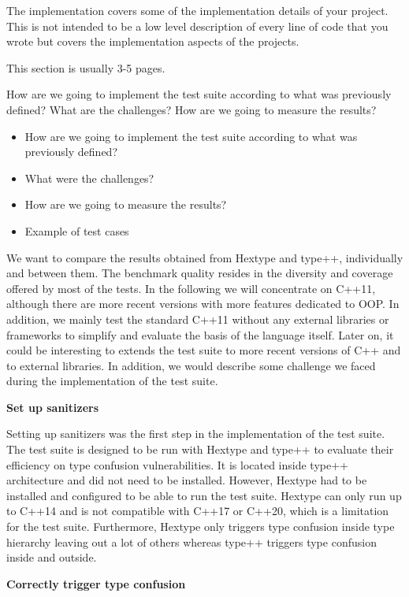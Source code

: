 \documentclass[a4paper,11pt,oneside]{report}
\begin{document}
The implementation covers some of the implementation details of your project.
This is not intended to be a low level description of every line of code that
you wrote but covers the implementation aspects of the projects.

This section is usually 3-5 pages.

How are we going to implement the test suite according to what was previously defined? What are the challenges? 
How are we going to measure the results?

\begin{itemize}
       \item How are we going to implement the test suite according to what was previously defined? 
       \item What were the challenges?
       \item How are we going to measure the results?
       \item Example of test cases
\end{itemize}

We want to compare the results obtained from Hextype and type++, individually and between them. The benchmark quality resides 
in the diversity and coverage offered by most of the tests. In the following we will concentrate on C++11,
although there are more recent versions with more features dedicated to OOP. In addition, we mainly test the standard
C++11 without any external libraries or frameworks to simplify and evaluate the basis of the language itself. Later on,
it could be interesting to extends the test suite to more recent versions of C++ and to external libraries. 
In addition, we would describe some challenge we faced during the implementation of the test suite.

\textbf{Set up sanitizers}

\noindent{}Setting up sanitizers was the first step in the implementation of the test suite.
The test suite is designed to be run with Hextype and type++ to evaluate their efficiency on type confusion vulnerabilities. 
It is located inside type++ architecture and did not need to be installed. However, Hextype had to be installed 
and configured to be able to run the test suite. Hextype can only run up to C++14 and is not compatible with C++17 or C++20, 
which is a limitation for the test suite. Furthermore, Hextype only triggers type confusion inside type hierarchy
leaving out a lot of others whereas type++ triggers type confusion inside and outside. 

\textbf{Correctly trigger type confusion}
\end{document}
